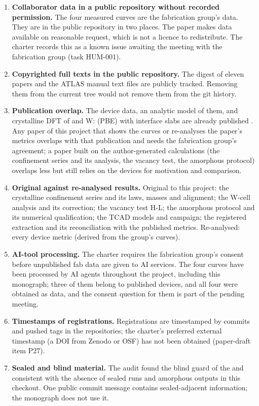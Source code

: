 \begin{enumerate}
\item \textbf{Collaborator data in a public repository without recorded permission.} The four measured curves are the
fabrication group's data. They are in the public repository in two places. The paper makes data available on reasonable
request, which is not a licence to redistribute. The charter records this as a known issue awaiting the meeting with the
fabrication group (task HUM-001).
\item \textbf{Copyrighted full texts in the public repository.} The digest of eleven papers and the ATLAS manual text
files are publicly tracked. Removing them from the current tree would not remove them from the git history.
\item \textbf{Publication overlap.} The device data, an analytic model of them, and crystalline DFT of \InO{}
and W:\InO{} (PBE) with interface slabs are already published \citep{Januar2026}. Any paper of
this project that shows the curves or re-analyses the paper's metrics overlaps with that publication and needs the
fabrication group's agreement; a paper built on the author-generated calculations (the confinement series and its
analysis, the vacancy test, the amorphous protocol) overlaps less but still relies on the devices for motivation and
comparison.
\item \textbf{Original against re-analysed results.} Original to this project: the crystalline confinement series and
its laws, masses and alignment; the W-cell analysis and its correction; the vacancy test H-L; the amorphous protocol and
its numerical qualification; the TCAD models and campaign; the registered extraction and its reconciliation with the
published metrics. Re-analysed: every device metric (derived from the group's curves).
\item \textbf{AI-tool processing.} The charter requires the fabrication group's consent before unpublished fab data are
given to AI services. The four curves have been processed by AI agents throughout the project, including this
monograph; three of them belong to published devices, and all four were obtained as data, and the consent question for them is part of the
pending meeting.
\item \textbf{Timestamps of registrations.} Registrations are timestamped by commits and pushed tags in the repositories;
the charter's preferred external timestamp (a DOI from Zenodo or OSF) has not been obtained (paper-draft item P27).
\item \textbf{Sealed and blind material.} The audit found the blind guard of the  and
 consistent with the absence of sealed runs and amorphous outputs in this checkout. One public
commit message contains sealed-adjacent information; the monograph does not use it.
\end{enumerate}

